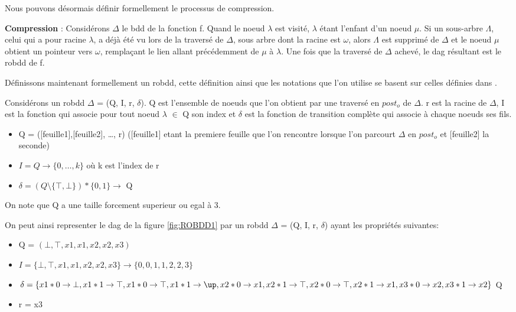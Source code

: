 \documentclass[french]{article}
\begin{document}
Nous pouvons désormais définir formellement le processus de compression.

\textbf{Compression} :  Considérons \(\Delta\) le bdd de la fonction f.  Quand le noeud \(\lambda\) est visité, \(\lambda\) étant l'enfant d'un noeud \(\mu\). Si un sous-arbre \(\Lambda\), celui qui a pour racine \(\lambda\), a déjà été vu lors de la traversé de \(\Delta\), sous arbre dont la racine est \(\omega\), alors \(\Lambda\) est supprimé de \(\Delta\) et le noeud \(\mu\) obtient un pointeur vers \(\omega\), remplaçant le lien allant précédemment de \(\mu\) à \(\lambda\). Une fois que la traversé de \(\Delta\) achevé, le dag résultant est le robdd de f.
\vspace{5mm} 

Définissons maintenant formellement un robdd, cette définition ainsi que les notations que l'on utilise se basent sur celles définies dans \cite{genitrini}.

Considérons un robdd \(\Delta\) = (Q, I, r, \(\delta\)). Q est l'ensemble de noeuds que l'on obtient par une traversé en \(post_{o}\) de \(\Delta\). r est la racine de \(\Delta\), I est la fonction qui associe pour tout noeud \(\lambda\) \(\in\) Q son index et \(\delta\) est la fonction de transition complète qui associe à chaque noeuds ses fils.
\begin{itemize}
    \item
    	Q  =   ([feuille1],[feuille2], …, r)
    	([feuille1] etant la premiere feuille que l'on rencontre lorsque l'on parcourt \(\Delta\) en \(post_{o}\) et [feuille2] la seconde)
    \item 
        \(I = Q   \rightarrow  \{0, \ldots , k\}\) où k est l'index de r
    \item 
       \( \delta = (Q \setminus  \{\top,  \bot\}) * \{0, 1\} \rightarrow \) Q
\end{itemize}

On note que Q a une taille forcement superieur ou egal à 3.

On peut ainsi representer le dag de la figure \ref{fig:ROBDD1} par un robdd \(\Delta\) = (Q, I, r, \(\delta\)) ayant les propriétés suivantes:
\begin{itemize}
    \item
    	Q  =   \((\bot, \top, x1,x1,x2,x2,x3)\)
    \item 
        \(I = \{\bot, \top, x1,x1,x2,x2,x3\}   \rightarrow  \{0,0,1,1,2,2,3\}\)
    \item 
       \( \delta = \{ x1 * 0 \rightarrow \bot , x1 * 1 \rightarrow \top, x1 * 0 \rightarrow \top , x1 * 1 \rightarrow \up, x2 * 0 \rightarrow x1, x2 * 1 \rightarrow \top, x2 * 0 \rightarrow \top, x2 * 1 \rightarrow x1, x3 * 0 \rightarrow x2, x3 * 1 \rightarrow x2 \} \) Q
    \item 
        r = x3
\end{itemize}
\end{document}
